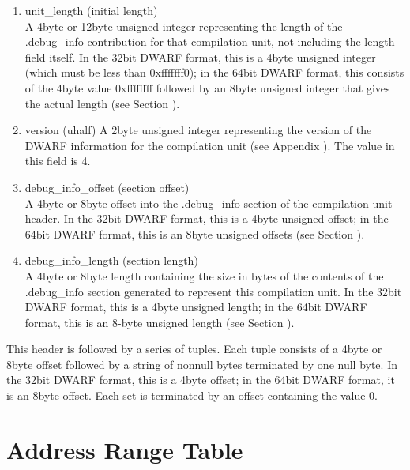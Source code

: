 \begin{enumerate}[1.]
\item unit\_length (initial length) \\
A 4\dash byte or 12\dash byte unsigned integer representing the length
of the .debug\_info contribution for that compilation unit,
not including the length field itself. In the 32\dash bit DWARF
format, this is a 4\dash byte unsigned integer (which must be less
than 0xfffffff0); in the 64\dash bit DWARF format, this consists
of the 4\dash byte value 0xffffffff followed by an 8\dash byte unsigned
integer that gives the actual length
(see Section ).

\item  version (uhalf)
A 2\dash byte unsigned integer representing the version of the
DWARF information for the compilation unit
(see Appendix ).
The value in this field is 4.

\item debug\_info\_offset (section offset) \\
A 4\dash byte or 8\dash byte offset into the .debug\_info
section of the compilation unit header.
In
the 32\dash bit DWARF format, this is a 4\dash byte unsigned offset;
in the 64\dash bit DWARF format, this is an 8\dash byte unsigned offsets
(see Section ).

\item  debug\_info\_length (section length) \\
A 4\dash byte or 8\dash byte length containing the size in bytes of the
contents of the .debug\_info section generated to represent
this compilation unit. In the 32\dash bit DWARF format, this is
a 4\dash byte unsigned length; in the 64\dash bit DWARF format, this
is an 8-byte unsigned length 
(see Section ).


\end{enumerate}

This header is followed by a series of tuples. Each tuple
consists of a 4\dash byte or 8\dash byte offset followed by a string
of non\dash null bytes terminated by one null byte. 
In the 32\dash bit
DWARF format, this is a 4\dash byte offset; in the 64\dash bit DWARF
format, it is an 8\dash byte offset. 
Each set is terminated by an
offset containing the value 0.


\section{Address Range Table}
\label{datarep:addrssrangetable}

